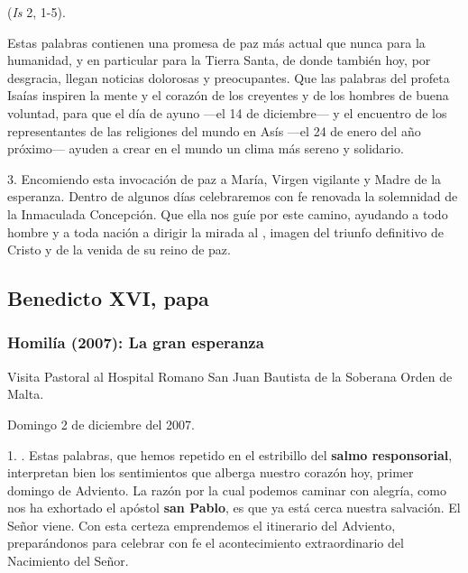 \begin{body}
 (\emph{Is} 2, 1-5).

Estas palabras contienen una promesa de paz más actual que nunca para la humanidad, y en particular para la Tierra Santa, de donde también hoy, por desgracia, llegan noticias dolorosas y preocupantes. Que las palabras del profeta Isaías inspiren la mente y el corazón de los creyentes y de los hombres de buena voluntad, para que el día de ayuno ---el 14 de diciembre--- y el encuentro de los representantes de las religiones del mundo en Asís ---el 24 de enero del año próximo--- ayuden a crear en el mundo un clima más sereno y solidario.

3. Encomiendo esta invocación de paz a María, Virgen vigilante y Madre de la esperanza. Dentro de algunos días celebraremos con fe renovada la solemnidad de la Inmaculada Concepción. Que ella nos guíe por este camino, ayudando a todo hombre y a toda nación a dirigir la mirada al , imagen del triunfo definitivo de Cristo y de la venida de su reino de paz.

\subsection{Benedicto XVI, papa}

\subsubsection{Homilía (2007): La gran esperanza}

Visita Pastoral al Hospital Romano San Juan Bautista de la Soberana Orden de Malta.

Domingo 2 de diciembre del 2007.

1. . Estas palabras, que hemos repetido en el estribillo del \textbf{salmo responsorial}, interpretan bien los sentimientos que alberga nuestro corazón hoy, primer domingo de Adviento. La razón por la cual podemos caminar con alegría, como nos ha exhortado el apóstol \textbf{san Pablo}, es que ya está cerca nuestra salvación. El Señor viene. Con esta certeza emprendemos el itinerario del Adviento, preparándonos para celebrar con fe el acontecimiento extraordinario del Nacimiento del Señor.


\end{body}
